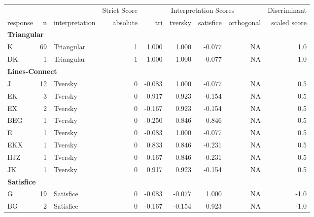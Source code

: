 \documentclass[
  letterpaper,
  DIV=11,
  numbers=noendperiod]{scrreprt}
\begin{document}
\begin{tabular}[t]{l|r|l|r|r|r|r|r|r}
\hline
\multicolumn{3}{c|}{ } & \multicolumn{1}{c|}{Strict Score} & \multicolumn{4}{c|}{Interpretation Scores} & \multicolumn{1}{c}{Discriminant} \\
\cline{4-4} \cline{5-8} \cline{9-9}
response & n & interpretation & absolute & tri & tversky & satisfice & orthogonal & scaled score\\
\hline
\multicolumn{9}{l}{\textbf{Triangular}}\\
\hline
\hspace{1em}K & 69 & Triangular & 1 & 1.000 & 1.000 & -0.077 & NA & 1.0\\
\hline
\hspace{1em}DK & 1 & Triangular & 1 & 1.000 & 1.000 & -0.077 & NA & 1.0\\
\hline
\multicolumn{9}{l}{\textbf{Lines-Connect}}\\
\hline
\hspace{1em}J & 12 & Tversky & 0 & -0.083 & 1.000 & -0.077 & NA & 0.5\\
\hline
\hspace{1em}EK & 3 & Tversky & 0 & 0.917 & 0.923 & -0.154 & NA & 0.5\\
\hline
\hspace{1em}EX & 2 & Tversky & 0 & -0.167 & 0.923 & -0.154 & NA & 0.5\\
\hline
\hspace{1em}BEG & 1 & Tversky & 0 & -0.250 & 0.846 & 0.846 & NA & 0.5\\
\hline
\hspace{1em}E & 1 & Tversky & 0 & -0.083 & 1.000 & -0.077 & NA & 0.5\\
\hline
\hspace{1em}EKX & 1 & Tversky & 0 & 0.833 & 0.846 & -0.231 & NA & 0.5\\
\hline
\hspace{1em}HJZ & 1 & Tversky & 0 & -0.167 & 0.846 & -0.231 & NA & 0.5\\
\hline
\hspace{1em}JK & 1 & Tversky & 0 & 0.917 & 0.923 & -0.154 & NA & 0.5\\
\hline
\multicolumn{9}{l}{\textbf{Satisfice}}\\
\hline
\hspace{1em}G & 19 & Satisfice & 0 & -0.083 & -0.077 & 1.000 & NA & -1.0\\
\hline
\hspace{1em}BG & 2 & Satisfice & 0 & -0.167 & -0.154 & 0.923 & NA & -1.0\\

\end{tabular}
\end{document}
